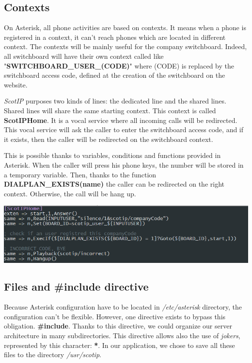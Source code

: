 \subsection{Contexts}
On Asterisk, all phone activities are based on contexts. It means when a phone is registered in a context, it can't reach phones which are located in different context. The contexts will be mainly useful for the company switchboard. Indeed, all switchboard will have their own context called like "\textbf{SWITCHBOARD\_USER\_(CODE)}" where (CODE) is replaced by the switchboard access code, defined at the creation of the switchboard on the website.


\textit{ScotIP} purposes two kinds of lines: the dedicated line and the shared lines.
Shared lines will share the same starting context. This context is called \textbf{ScotIPHome}. It is a vocal service where all incoming calls will be redirected. This vocal service will ask the caller to enter the switchboard access code, and if it exists, then the caller will be redirected on the switchboard context.


This is possible thanks to variables, conditions and functions provided in Asterisk. When the caller will press his phone keys, the number will be stored in a temporary variable. Then, thanks to the function \textbf{DIALPLAN\_EXISTS(name)} the caller can be redirected on the right context. Otherwise, the call will be hang up. 

\includegraphics[width=1\textwidth]{img/context_scotiphome.png}


\subsection{Files and \#include directive}

Because Asterisk configuration have to be located in \textit{/etc/asterisk} directory, the configuration can't be flexible. However, one directive exists to bypass this obligation. \textbf{\#include}. Thanks to this directive, we could organize our server architecture in many subdirectories. This directive allows also the use of \textit{jokers}, represented by this character: \textbf{*}. In our application, we chose to save all these files to the directory \textit{/usr/scotip}.

